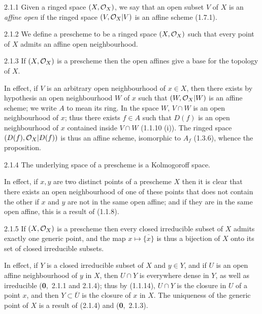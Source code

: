 \documentclass[../main.tex]{subfiles}
\begin{document}
\begin{cx}{2.1.1}
    Given a ringed space $(X,\mathcal{O}_X)$, we say that an open subset $V$ of $X$ is an \emph{affine open} if the ringed space $(V,\mathcal{O}_X|V)$ is an affine scheme (1.7.1).
\end{cx}

\begin{cx}[Definition]{2.1.2}
    We define a prescheme to be a ringed space $(X,\mathcal{O}_X)$ such that every point of $X$ admits an affine open neighbourhood.
\end{cx}

\begin{cx}[Proposition]{2.1.3}
    If $(X,\mathcal{O}_X)$ is a prescheme then the open affines give a base for the topology of $X$.
\end{cx}

In effect, if $V$ is an arbitrary open neighbourhood of $x\in X$, then there exists by hypothesis an open neighbourhood $W$ of $x$ such that $(W,\mathcal{O}_X|W)$ is an affine scheme; we write $A$ to mean its ring.
In the space $W$, $V\cap W$ is an open neighbourhood of $x$; thus there exists $f\in A$ such that $D(f)$ is an open neighbourhood of $x$ contained inside $V\cap W$ (1.1.10 (i)).
The ringed space $(D(f),\mathcal{O}_X|D(f))$ is thus an affine scheme, isomorphic to $A_f$ (1.3.6), whence the proposition.

\begin{cx}[Proposition]{2.1.4}
    The underlying space of a prescheme is a Kolmogoroff space.
\end{cx}

In effect, if $x,y$ are two distinct points of a prescheme $X$ then it is clear that there exists an open neighbourhood of one of these points that does not contain the other if $x$ and $y$ are not in the same open affine; and if they are in the same open affine, this is a result of (1.1.8).

\begin{cx}[Proposition]{2.1.5}
    If $(X,\mathcal{O}_X)$ is a prescheme then every closed irreducible subset of $X$ admits exactly one generic point, and the map $x\mapsto\overline{\{x\}}$ is thus a bijection of $X$ onto its set of closed irreducible subsets.
\end{cx}

In effect, if $Y$ is a closed irreducible subset of $X$ and $y\in Y$, and if $U$ is an open affine neighbourhood of $y$ in $X$, then $U\cap Y$ is everywhere dense in $Y$, as well as irreducible (\textbf{0},~2.1.1 and 2.1.4); thus by (1.1.14), $U\cap Y$ is the closure in $U$ of a point $x$, and then $Y\subset\overline{U}$ is the closure of $x$ in $X$.
The uniqueness of the generic point of $X$ is a result of (2.1.4) and (\textbf{0},~2.1.3).
\end{document}
